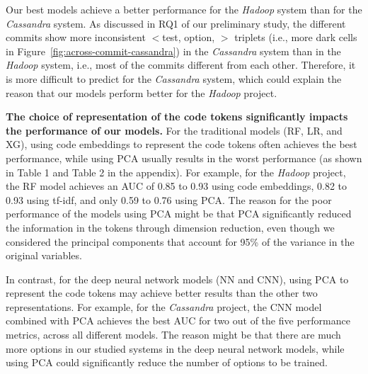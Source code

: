 Our best models achieve a better performance for the \emph{Hadoop} system 
than for the \emph{Cassandra} system. %
As discussed in RQ1 of our preliminary study, the different commits show more inconsistent $<$test, option, \inconsistent$>$ triplets (i.e., more dark cells in Figure~\ref{fig:across-commit-cassandra}) in the \emph{Cassandra} system than in the \emph{Hadoop} system, i.e., most of the commits different from each other. Therefore, it is more difficult to predict \inconsistent for the \emph{Cassandra} system, which could explain the reason that our models perform better for the \emph{Hadoop} project. %

\noindent \textbf{The choice of representation of the code tokens significantly impacts the performance of our models.} For the traditional models (RF, LR, and XG), using code embeddings to represent the code tokens often achieves the best performance, while using PCA usually results in the worst performance (as shown in Table 1 and Table 2 in the appendix). For example, for the \emph{Hadoop} project, the RF model achieves an AUC of 0.85 to 0.93 using code embeddings, 0.82 to 0.93 using tf-idf, and only 0.59 to 0.76 using PCA. The reason for the poor performance of the models using PCA might be that PCA significantly reduced the information in the tokens through dimension reduction, even though we considered the principal components that account for 95\% of the variance in the original variables.

In contrast, for the deep neural network models (NN and CNN), using PCA to represent the code tokens may achieve better results than the other two representations. For example, for the \emph{Cassandra} project, the CNN model combined with PCA achieves the best AUC for two out of the five performance metrics, across all different models.
The reason might be that there are much more options in our studied systems %
in the deep neural network models, while using PCA could significantly reduce the number of options to be trained.


